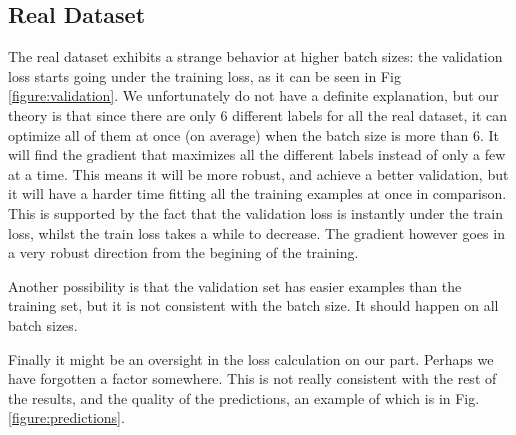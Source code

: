 \documentclass[10pt,conference]{IEEEtran}
\begin{document}
\subsection{Real Dataset}
The real dataset exhibits a strange behavior at higher batch sizes: the validation loss starts going under the training loss, as it can be seen in Fig \ref{figure:validation}. We unfortunately do not have a definite explanation, but our theory is that since there are only 6 different labels for all the real dataset, it can optimize all of them at once (on average) when the batch size is more than 6. It will find the gradient that maximizes all the different labels instead of only a few at a time. This means it will be more robust, and achieve a better validation, but it will have a harder time fitting all the training examples at once in comparison. This is supported by the fact that the validation loss is instantly under the train loss, whilst the train loss takes a while to decrease. The gradient however goes in a very robust direction from the begining of the training.\par
Another possibility is that the validation set has easier examples than the training set, but it is not consistent with the batch size. It should happen on all batch sizes.\par
Finally it might be an oversight in the loss calculation on our part. Perhaps we have forgotten a factor somewhere. This is not really consistent with the rest of the results, and the quality of the predictions, an example of which is in Fig. \ref{figure:predictions}.
\end{document}
